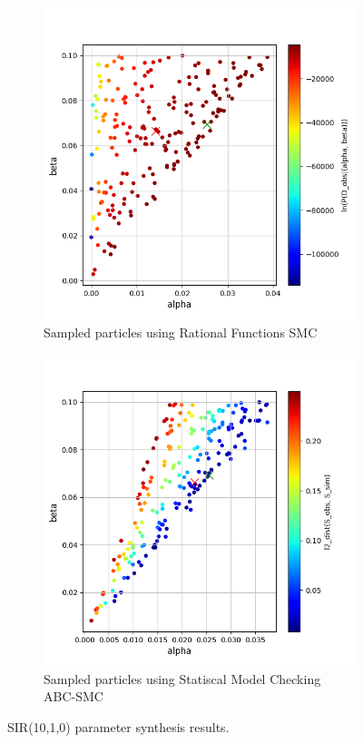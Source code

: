 \begin{figure}[H]
    \centering
    \begin{subfigure}{0.48\textwidth}
        \centering
        \includegraphics[width=\linewidth]{figures/sir1010_rfsmc.png}
        \caption{Sampled particles using Rational Functions SMC}
    \end{subfigure}
    \hfill
    \begin{subfigure}{0.48\textwidth}
        \centering
        \includegraphics[width=\linewidth]{figures/sir1010_abcsmc.png}
        \caption{Sampled particles using Statiscal Model Checking ABC-SMC}
    \end{subfigure}
    \caption{SIR(10,1,0) parameter synthesis results.}
\end{figure}

